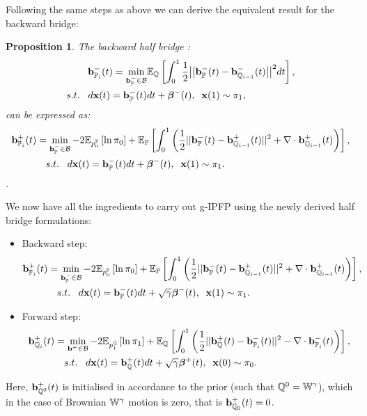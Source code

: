 \documentclass[a4paper,12pt,twoside,openright]{report}
\newtheorem{proposition}{Proposition}
\theoremstyle{definition}
\begin{document}
Following the same steps as above we can derive the equivalent result for the backward bridge:
\begin{proposition}
The backward half bridge :
\begin{align*} 
   {\mathbf{b}}^{-}_{{\mathbb{P}}_{i}}(t) =\min_{{\mathbf{b}}_{{\mathbb{P}}}^{-} \in {\mathcal{B}} } & \mathbb{E}_{\mathbb{Q}}\left[\int_0^1 \frac{1}{2}\big|\big|{\mathbf{b}}_{\mathbb{P}}^{-}(t) -{\mathbf{b}}^{-}_{{\mathbb{Q}}_{i-1}}(t)\big|\big|^2 dt\right], \nonumber \\
    s.t.\;\;\; d{\mathbf{x}}(t) = {\mathbf{b}}_{\mathbb{P}}^{-}(t) &dt +  {\bm{\beta}}^{-}(t), \;\; {\mathbf{x}}(1) \sim \pi_1,
\end{align*}
can be expressed as:
\begin{align} \label{eq:div_control_backward}
   {\mathbf{b}}^{+}_{{\mathbb{P}}_{i}}(t) =\min_{{\mathbf{b}}_{\mathbb{P}}^{-} \in {\mathcal{B}} } -2\mathbb{E}_{p^{{\mathbb{P}}}_0}\left[\operatorname{ln} \pi_0 \right] &+ \mathbb{E}_{{\mathbb{P}}}\left[\int_0^1 \left(\frac{1}{2}||{\mathbf{b}}_{\mathbb{P}}^{-}(t) - {\mathbf{b}}_{{\mathbb{Q}}_{i-1}}^{+}(t)||^2 + \nabla\cdot{\mathbf{b}}^{+}_{{\mathbb{Q}}_{i-1}}(t) \right)\right], \nonumber \\
    s.t.\;\;\; d{\mathbf{x}}(t) = {\mathbf{b}}_{\mathbb{P}}^{-}(t) &dt +  {\bm{\beta}}^{-}(t), \;\; {\mathbf{x}}(1) \sim \pi_1.
\end{align}.
\end{proposition}
We now have all the ingredients to carry out g-IPFP using the newly derived half bridge formulations:
\begin{itemize}
    \item Backward step:
    \begin{align*}
   {\mathbf{b}}^{+}_{{\mathbb{P}}_{i}}(t) =\min_{{\mathbf{b}}_{\mathbb{P}}^{-} \in {\mathcal{B}} } -2\mathbb{E}_{p^{{\mathbb{P}}}_0}\left[\operatorname{ln} \pi_0 \right] &+ \mathbb{E}_{{\mathbb{P}}}\left[\int_0^1 \left(\frac{1}{2}||{\mathbf{b}}_{\mathbb{P}}^{-}(t) - {\mathbf{b}}_{{\mathbb{Q}}_{i-1}}^{+}(t)||^2 + \nabla\cdot{\mathbf{b}}^{+}_{{\mathbb{Q}}_{i-1}}(t) \right)\right], \nonumber \\
    s.t.\;\;\; d{\mathbf{x}}(t) = {\mathbf{b}}_{\mathbb{P}}^{-}(t) &dt + \sqrt{\gamma} {\bm{\beta}}^{-}(t), \;\; {\mathbf{x}}(1) \sim \pi_1.
    \end{align*}
    \item Forward step:
    \begin{align*} 
   {\mathbf{b}}^{+}_{{\mathbb{Q}}_{i}}(t) =\min_{{\mathbf{b}}^{+} \in {\mathcal{B}} } -2\mathbb{E}_{p^{{\mathbb{Q}}}_1}\left[\operatorname{ln} \pi_1 \right] &+ \mathbb{E}_{{\mathbb{Q}}}\left[\int_0^1 \left(\frac{1}{2}||{\mathbf{b}}_{\mathbb{Q}}^{+}(t) - {\mathbf{b}}_{{\mathbb{P}}_{i}}^{-}(t)||^2 - \nabla\cdot{\mathbf{b}}^{-}_{{\mathbb{P}}_{i}}(t) \right)\right], \nonumber \\
    s.t.\;\;\; d{\mathbf{x}}(t) = {\mathbf{b}}_{\mathbb{Q}}^{+}(t) &dt + \sqrt{\gamma} {\bm{\beta}}^{+}(t), \;\; {\mathbf{x}}(0) \sim \pi_0.
    \end{align*}
\end{itemize}
Here, ${\mathbf{b}}^{+}_{{\mathbb{Q}}^{0}}(t)$  is initialised in accordance to the prior (such that ${\mathbb{Q}}^0=\mathbb{W}^\gamma$), which in the case of Brownian $\mathbb{W}^\gamma$ motion is zero, that is ${\mathbf{b}}^{+}_{{\mathbb{Q}}_{0}}(t) =0$.
\end{document}
